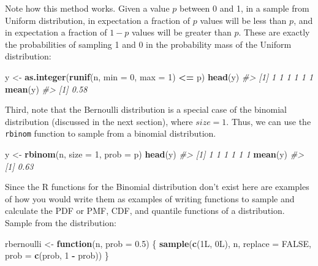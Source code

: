 \documentclass[]{book}
\newenvironment{Shaded}{\begin{snugshade}}{\end{snugshade}}
\newcommand{\CommentTok}[1]{\textcolor[rgb]{0.56,0.35,0.01}{\textit{#1}}}
\newcommand{\ControlFlowTok}[1]{\textcolor[rgb]{0.13,0.29,0.53}{\textbf{#1}}}
\newcommand{\DataTypeTok}[1]{\textcolor[rgb]{0.13,0.29,0.53}{#1}}
\newcommand{\DecValTok}[1]{\textcolor[rgb]{0.00,0.00,0.81}{#1}}
\newcommand{\FloatTok}[1]{\textcolor[rgb]{0.00,0.00,0.81}{#1}}
\newcommand{\KeywordTok}[1]{\textcolor[rgb]{0.13,0.29,0.53}{\textbf{#1}}}
\newcommand{\NormalTok}[1]{#1}
\newcommand{\OperatorTok}[1]{\textcolor[rgb]{0.81,0.36,0.00}{\textbf{#1}}}
\newcommand{\OtherTok}[1]{\textcolor[rgb]{0.56,0.35,0.01}{#1}}
\newcommand{\StringTok}[1]{\textcolor[rgb]{0.31,0.60,0.02}{#1}}
\theoremstyle{definition}
\theoremstyle{definition}
\theoremstyle{definition}
\theoremstyle{remark}
\begin{document}
Note how this method works. Given a value \(p\) between 0 and 1, in a
sample from Uniform distribution, in expectation a fraction of \(p\)
values will be less than \(p\), and in expectation a fraction of
\(1 - p\) values will be greater than \(p\). These are exactly the
probabilities of sampling 1 and 0 in the probability mass of the Uniform
distribution:

\begin{Shaded}
\begin{Highlighting}[]
\NormalTok{y <-}\StringTok{ }\KeywordTok{as.integer}\NormalTok{(}\KeywordTok{runif}\NormalTok{(n, }\DataTypeTok{min =} \DecValTok{0}\NormalTok{, }\DataTypeTok{max =} \DecValTok{1}\NormalTok{) }\OperatorTok{<=}\StringTok{ }\NormalTok{p)}
\KeywordTok{head}\NormalTok{(y)}
\CommentTok{#> [1] 1 1 1 1 1 1}
\KeywordTok{mean}\NormalTok{(y)}
\CommentTok{#> [1] 0.58}
\end{Highlighting}
\end{Shaded}

Third, note that the Bernoulli distribution is a special case of the
binomial distribution (discussed in the next section), where
\(size = 1\). Thus, we can use the \texttt{rbinom} function to sample
from a binomial distribution.

\begin{Shaded}
\begin{Highlighting}[]
\NormalTok{y <-}\StringTok{ }\KeywordTok{rbinom}\NormalTok{(n, }\DataTypeTok{size =} \DecValTok{1}\NormalTok{, }\DataTypeTok{prob =}\NormalTok{ p)}
\KeywordTok{head}\NormalTok{(y)}
\CommentTok{#> [1] 1 1 1 1 1 1}
\KeywordTok{mean}\NormalTok{(y)}
\CommentTok{#> [1] 0.63}
\end{Highlighting}
\end{Shaded}

Since the R functions for the Binomial distribution don't exist here are
examples of how you would write them as examples of writing functions to
sample and calculate the PDF or PMF, CDF, and quantile functions of a
distribution. Sample from the distribution:

\begin{Shaded}
\begin{Highlighting}[]
\NormalTok{rbernoulli <-}\StringTok{ }\ControlFlowTok{function}\NormalTok{(n, }\DataTypeTok{prob =} \FloatTok{0.5}\NormalTok{) \{}
  \KeywordTok{sample}\NormalTok{(}\KeywordTok{c}\NormalTok{(1L, 0L), n, }\DataTypeTok{replace =} \OtherTok{FALSE}\NormalTok{, }\DataTypeTok{prob =} \KeywordTok{c}\NormalTok{(prob, }\DecValTok{1} \OperatorTok{-}\StringTok{ }\NormalTok{prob))}
\NormalTok{\}}
\end{Highlighting}
\end{Shaded}
\end{document}
